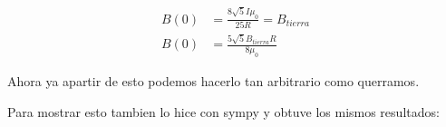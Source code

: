 \documentclass{report}
\begin{document}
\begin{align*}
	B(0) &= \frac{8 \sqrt{5} I \mu_{0}}{25 R} = B_{tierra}\\
	B(0) &= \frac{5 \sqrt{5} B_{tierra} R}{8 \mu_{0}}
\end{align*}

Ahora ya apartir de esto podemos hacerlo tan arbitrario como  querramos.

Para mostrar esto tambien lo hice con sympy y obtuve los mismos resultados:

\end{document}
